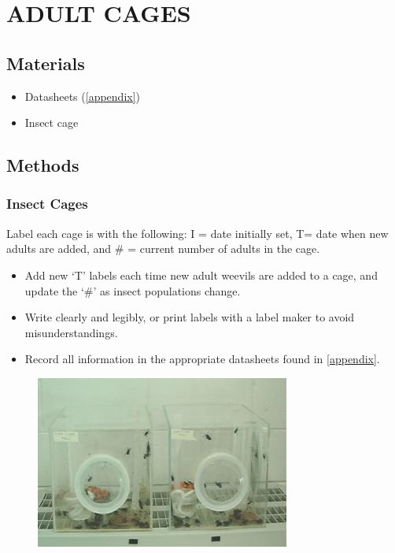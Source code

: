 \documentclass{sop_class}[overrideChapters] %
\begin{document}
{{\chapter{ADULT CAGES}\label{adult-cages}}

\hypertarget{materials}{%
\section{Materials}\label{materials}}
\begin{itemize}
\item
  Datasheets (\ref{appendix})
\item
  Insect cage
\end{itemize}
\hypertarget{methods}{%
\section{Methods}\label{methods}}

\hypertarget{insect-cages}{%
\subsection{Insect Cages}\label{insect-cages}}

Label each cage is with the following: I = date initially set, T= date
when new adults are added, and \# = current number of adults in the
cage.
\begin{itemize}
\item
  Add new `T' labels each time new adult weevils are added to a cage,
  and update the `\#' as insect populations change.
\item
  Write clearly and legibly, or print labels with a label maker to
  avoid misunderstandings.
\item
  Record all information in the appropriate datasheets found in
  \ref{appendix}.
\end{itemize}
\begin{figure}

{\centering \includegraphics[width=1\linewidth]{figure/adult_cage} 

}
\end{figure}}
\end{document}
